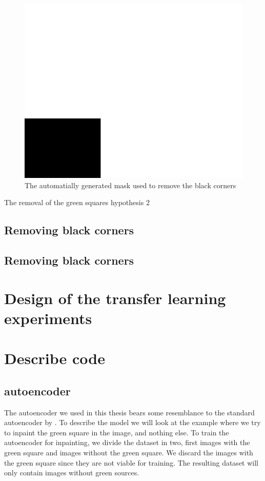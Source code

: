 \begin{figure}[h]
\centering
\includegraphics[scale=0.3]{experiments/figures/default-green.png}
\caption{The automatially generated mask used to remove the black corners}
\label{fig:corner_mask}
\end{figure}

The removal of the green squares  hypothesis 2




\subsection{Removing black corners}
\subsection{Removing black corners}

\section{Design of the transfer learning experiments}

 
\section{Describe code}
\subsection{autoencoder}
The autoencoder we used in this thesis bears some resemblance to the standard autoencoder by . 
To describe the model we will look at the example where we try to inpaint the green square in the image, and nothing else.
To train the autoencoder for inpainting, we divide the dataset in two, first images with the green square and images without the green square. We discard the images with the green square since they are not viable for training. 
The resulting dataset will only contain images without green sources.


